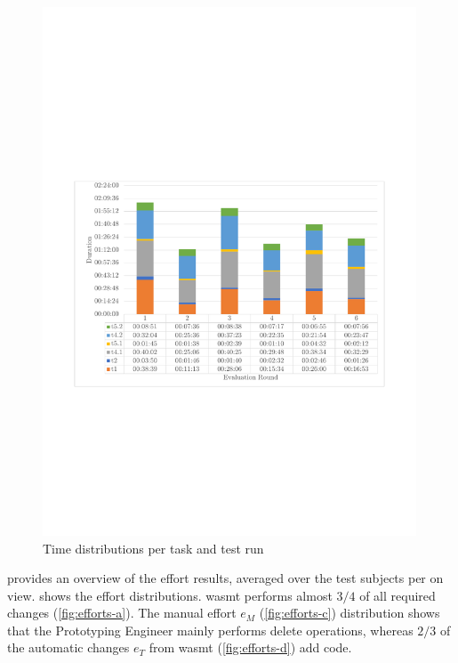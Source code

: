 \begin{figure}[hbt]
\hypertarget{fig:awsm.rm.rewamp.timetask}{%
\centering
\includegraphics[width=0.99\textwidth]{../figures/rewamp/time-task.pdf}
\caption{Time distributions per task and test run}\label{fig:awsm.rm.rewamp.timetask}
}
\end{figure}

\vspace{-15pt}
 provides an overview of the effort results, averaged over the test subjects per on view.
 shows the effort distributions.
\gls{wasmt} performs almost \(3/4\) of all required changes (\cref{fig:efforts-a}).
The manual effort \(e_M\) (\cref{fig:efforts-c}) distribution shows that the Prototyping Engineer mainly performs delete operations, whereas \(2/3\) of the automatic changes \(e_T\) from \gls{wasmt} (\cref{fig:efforts-d}) add code.

